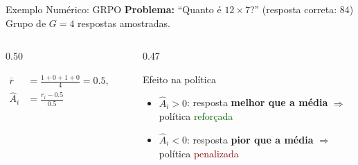 \documentclass[aspectratio=169, xcolor=dvipsnames]{beamer}
\begin{document}
  \begin{frame}{Exemplo Numérico: GRPO}
    \textbf{Problema:} ``Quanto é $12 \times 7$?'' \quad (resposta correta: $84$) \quad
    Grupo de $G = 4$ respostas amostradas.

    \begin{columns}[T]
      \begin{column}{0.50\textwidth}

        \begin{align*}
          \overline{r} &= \tfrac{1+0+1+0}{4} = 0.5, \qquad \sigma_r = 0.5 \\
          \hat{A}_i &= \frac{r_i - 0.5}{0.5}
        \end{align*}
      \end{column}
      \begin{column}{0.47\textwidth}
        \begin{block}{Efeito na política}
          \begin{itemize}
            \item $\hat{A}_i > 0$: resposta \textbf{melhor que a média}
              $\Rightarrow$ política \textcolor{DarkGreen}{reforçada}
            \item $\hat{A}_i < 0$: resposta \textbf{pior que a média}
              $\Rightarrow$ política \textcolor{DarkRed}{penalizada}
          \end{itemize}
        \end{block}


\end{column}
\end{columns}
\end{frame}
\end{document}
